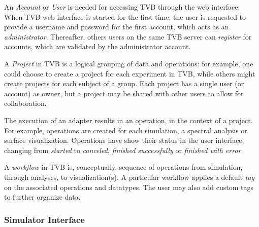 \documentclass{bioinfo}
\begin{document}
		An \emph{Account} or \emph{User} is needed for accessing TVB through
		the web interface.  When TVB web interface is started for the first
		time, the user is requested to provide a username and 
		password for the first account, which acts as an \emph{administrator}.
        Thereafter, others users on the same TVB server can \emph{register}
		for accounts, which are validated by the administrator account.

		A \emph{Project} in TVB is a logical grouping of data and operations: 
        for example, one could choose to
		create a project for each experiment in TVB, while others might
		create projects for each subject of a group. Each project has a single
		user (or account) as owner, but a project may be shared
		with other users to allow for collaboration.

		The execution of an adapter results in an operation, in the
		context of a project. For example, operations are created for each
		simulation, a spectral analysis or surface visualization. 
        Operations have show their status in the user interface, changing from
		\emph{started} to \emph{canceled}, \emph{finished successfully} or
		\emph{finished with error}. 

		A \emph{workflow} in TVB is, conceptually, sequence of operations from simulation,
        through analyses, to visualization(s). A particular workflow applies
		 a default \emph{tag} on the associated operations and
		datatypes.
        The user may also add custom tags to further organize data.

		\subsubsection{Simulator Interface}
\end{document}

